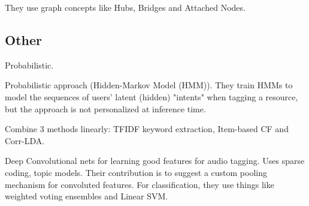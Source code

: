 They use graph concepts like Hubs, Bridges and Attached Nodes.

\subsection{Other}

\cite{si_sun_2010} Probabilistic.

\cite{trabelsi_etal_2012} Probabilistic approach (Hidden-Markov Model (HMM)). They train HMMs to model the sequences of users' latent (hidden) "intents" when tagging a resource, but the approach is not personalized at inference time.

\cite{liu_etal_2013} Combine 3 methods linearly: TFIDF keyword extraction, Item-based CF and Corr-LDA.



\cite{sattigeri_etal_2014}
Deep Convolutional nets for learning good features for audio tagging. Uses sparse coding, topic models.
Their contribution is to suggest a custom pooling mechanism for convoluted features.
For classification, they use things like weighted voting ensembles and Linear SVM.



